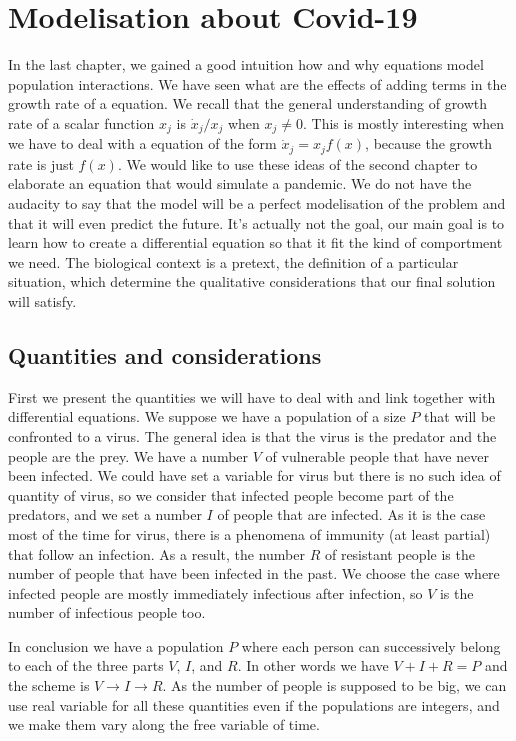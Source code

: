 \chapter{Modelisation about Covid-19}
In the last chapter, we gained a good intuition how and why \LV equations model population interactions. We have seen what are the effects of adding terms in the growth rate of a equation. We recall that the general understanding of growth rate of a scalar function $x_j$ is $\dot{x}_j/x_j$ when $x_j\neq0$. This is mostly interesting when we have to deal with a equation of the form $\dot{x}_j=x_jf(x)$, because the growth rate is just $f(x)$. We would like to use these ideas of the second chapter to elaborate an equation that would simulate a pandemic. We do not have the audacity to say that the model will be a perfect modelisation of the problem and that it will even predict the future. It's actually not the goal, our main goal is to learn how to create a differential equation so that it fit the kind of comportment we need. The biological context is a pretext, the definition of a particular situation, which determine the qualitative considerations that our final solution will satisfy.
\section{Quantities and considerations}
First we present the quantities we will have to deal with and link together with differential equations. We suppose we have a population of a size $P$ that will be confronted to a virus. The general idea is that the virus is the predator and the people are the prey. We have a number $V$ of vulnerable people that have never been infected. We could have set a variable for virus but there is no such idea of quantity of virus, so we consider that infected people become part of the predators, and we set a number $I$ of people that are infected. As it is the case most of the time for virus, there is a phenomena of immunity (at least partial) that follow an infection. As a result, the number $R$ of resistant people is the number of people that have been infected in the past. We choose the case where infected people are mostly immediately infectious after infection, so $V$ is the number of infectious people too.

In conclusion we have a population $P$ where each person can successively belong to each of the three parts $V$, $I$, and $R$. In other words we have $V+I+R=P$ and the scheme is $V\to I\to R$.
As the number of people is supposed to be big, we can use real variable for all these quantities even if the populations are integers, and we make them vary along the free variable of time.


